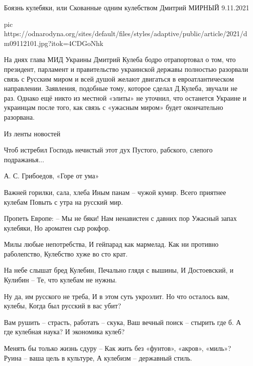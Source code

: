  
 
 
 
 


Боязнь кулебяки, или Скованные одним кулебством
Дмитрий МИРНЫЙ
9.11.2021 

\ifcmt
  pic https://odnarodyna.org/sites/default/files/styles/adaptive/public/article/2021/dm09112101.jpg?itok=4CDGoNhk
\fi

На днях глава МИД Украины Дмитрий Кулеба бодро отрапортовал о том, что
президент, парламент и правительство украинской державы полностью разорвали
связь с Русским миром и всей душой желают двигаться в евроатлантическом
направлении. Заявления, подобные тому, которое сделал Д.Кулеба, звучали не раз.
Однако ещё никто из местной «элиты» не уточнил, что останется Украине и
украинцам после того, как связь с «ужасным миром» будет окончательно разорвана. 

Из ленты новостей

Чтоб истребил Господь нечистый этот дух
Пустого, рабского, слепого подражанья...

А. С. Грибоедов, «Горе от ума»

Важней горилки, сала, хлеба
Иным панам – чужой кумир.
Всего приятнее кулебам
Повыть с утра на русский мир.

Пропеть Европе: – Мы не бяки!
Нам ненавистен с давних пор
Ужасный запах кулебяки,
Но ароматен сыр рокфор.

Милы любые непотребства,
И гейпарад как мармелад.
Как ни противно раболепство,
Кулебство хуже во сто крат.

На небе слышат бред Кулебин,
Печально глядя с вышины,
И Достоевский, и Кулибин – 
Те, что кулебам не нужны.

Ну да, им русского не треба,
И в этом суть укроэлит.
Но что осталось вам, кулебы,
Когда был русский в вас убит?

Вам рушить – страсть, работать – скука,
Ваш вечный поиск – стырить где б.
А где кулебная наука?
И экономика кулеб?

Менять бы только жизнь сдуру – 
Как жить без «фунтов», «акров», «миль»?
Руина – ваша цель в культуре,
А кулебизм – державный стиль.


